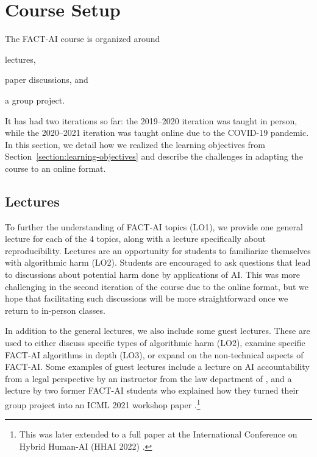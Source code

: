 
\section{Course Setup}
\label{section:coursesetup}

The FACT-AI course is organized around 
\begin{enumerate*}[label=(\roman*)]
    \item lectures, 
    \item paper discussions, and
    \item a group project. 
\end{enumerate*}
It has had two iterations so far: the 2019--2020 iteration was taught in person, while the 2020--2021 iteration was taught online due to the COVID-19 pandemic. 
In this section, we detail how we realized the learning objectives from Section~\ref{section:learning-objectives} and describe the challenges in adapting the course to an online format.

\subsection{Lectures}
To further the understanding of FACT-AI topics (LO1), we provide one general lecture for each of the 4 topics, along with a lecture specifically about reproducibility.
Lectures are an opportunity for students to familiarize themselves with algorithmic harm (LO2). Students are encouraged to ask questions that lead to discussions about potential harm done by applications of AI. 
This was more challenging in the second iteration of the course due to the online format, but we hope that facilitating such discussions will be more straightforward once we return to in-person classes. 

In addition to the general lectures, we also include some guest lectures. 
These are used to either discuss specific types of algorithmic harm (LO2), examine specific FACT-AI algorithms in depth (LO3), or expand on the non-technical aspects of FACT-AI. 
Some examples of guest lectures include a lecture on AI accountability from a legal perspective by an instructor from the law department of \OurUniversity{}, and a lecture by two former FACT-AI students who explained how they turned their group project into an ICML 2021 workshop paper \citep{neely2021order}.\footnote{This was later extended to a full paper at the International Conference on Hybrid Human-AI (HHAI 2022) \citep{neely2022song}.} 


